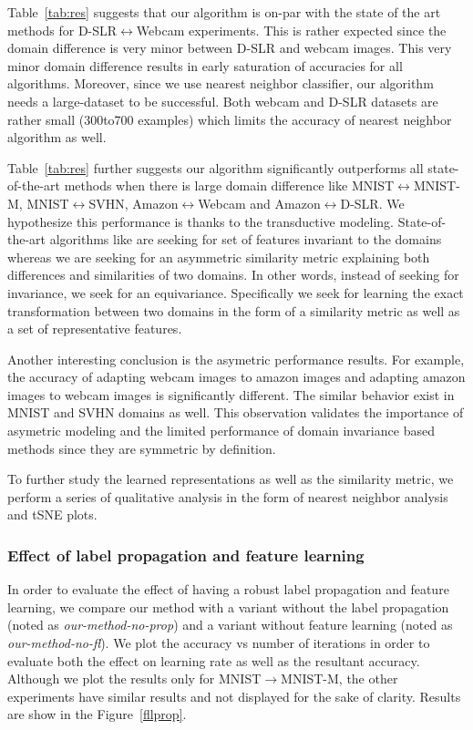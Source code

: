 Table~\ref{tab:res} suggests that our algorithm is on-par with the state of the art methods for D-SLR$\leftrightarrow$Webcam experiments. This is rather expected since the domain difference is very minor between D-SLR and webcam images. This very minor domain difference results in early saturation of accuracies for all algorithms. Moreover, since we use nearest neighbor classifier, our algorithm needs a large-dataset to be successful. Both webcam and D-SLR datasets are rather small (300to700 examples) which limits the accuracy of nearest neighbor algorithm as well.

Table~\ref{tab:res} further suggests our algorithm significantly outperforms all state-of-the-art methods when there is large domain difference like MNIST$\leftrightarrow$MNIST-M, MNIST$\leftrightarrow$SVHN, Amazon$\leftrightarrow$Webcam and Amazon$\leftrightarrow$D-SLR. We hypothesize this performance is thanks to the transductive modeling. State-of-the-art algorithms like \cite{ganin15} are seeking for set of features invariant to the domains whereas we are seeking for an asymmetric similarity metric explaining both differences and similarities of two domains. In other words, instead of seeking for invariance, we seek for an equivariance. Specifically we seek for learning the exact transformation between two domains in the form of a similarity metric as well as a set of representative features.

Another interesting conclusion is the asymetric performance results. For example, the accuracy of adapting webcam images to amazon images and adapting amazon images to webcam images is significantly different. The similar behavior exist in MNIST and SVHN domains as well. This observation validates the importance of asymetric modeling and the limited performance of domain invariance based methods since they are symmetric by definition. 

To further study the learned representations as well as the similarity metric, we perform a series of qualitative analysis in the form of nearest neighbor analysis and tSNE\cite{tsne} plots.

\subsubsection{Effect of label propagation and feature learning}
In order to evaluate the effect of having a robust label propagation and feature learning, we compare our method with a variant without the label propagation (noted as \emph{our-method-no-prop}) and a variant without feature learning (noted as \emph{our-method-no-fl}). We plot the accuracy vs number of iterations in order to evaluate both the effect on learning rate as well as the resultant accuracy. Although we plot the results only for MNIST$\rightarrow$MNIST-M, the other experiments have similar results and not displayed for the sake of clarity. Results are show in the Figure~\ref{fllprop}. 

